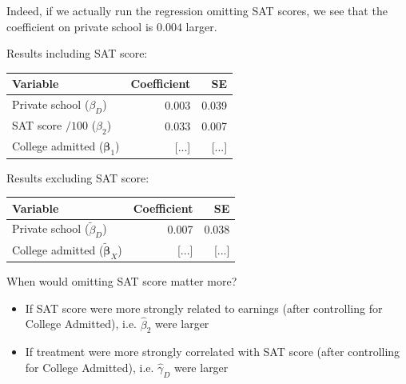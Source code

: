 \documentclass[11pt,english,handout]{beamer}
\newenvironment{wideitemize}{\itemize\addtolength{\itemsep}{10pt}}{\enditemize}
\begin{document}
\begin{frame}
	\begin{wideitemize}
		\item
		Indeed, if we actually run the regression omitting SAT scores, we see that the coefficient on private school is $0.004$ larger.
		
		\item
		Results including SAT score:
		
			\begin{tabular}{lrr}
			Variable & Coefficient & SE \\ \hline
			Private school ($\beta_D$) & 0.003 & 0.039 \\
			SAT score $/ 100$ ($\beta_2$) & 0.033 & 0.007 \\
			College admitted ($\bm\beta_1$) & [...] & [...]
		\end{tabular}
		
		
		\item
		Results excluding SAT score:
					\begin{tabular}{lrr}
			Variable & Coefficient & SE \\ \hline
			Private school ($\tilde\beta_D$) & 0.007 & 0.038 \\
			College admitted ($\bm{\tilde\beta}_X$) & [...] & [...]
		\end{tabular}
	
		\item
		When would omitting SAT score matter more? \pause
			\begin{itemize}
				\item 
				If SAT score were more strongly related to earnings (after controlling for College Admitted), i.e. $\hat\beta_2$ were larger
				
				\pause
				\item
				If treatment were more strongly correlated with SAT score (after controlling for College Admitted), i.e. $\hat\gamma_D$ were larger
			\end{itemize}
			
	\end{wideitemize}
\end{frame}
\end{document}
